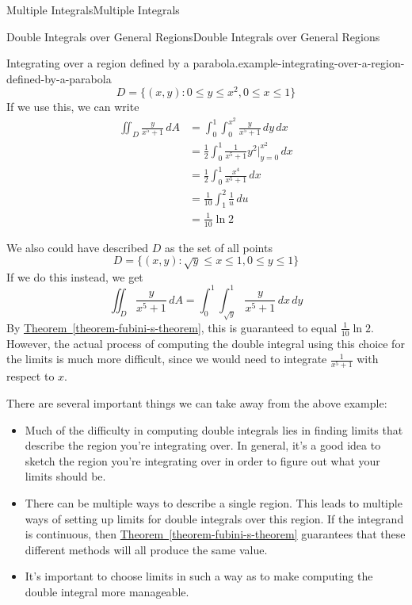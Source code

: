 \documentclass[10pt,]{book}
\numberwithin{equation}{section}
\begin{document}
\begin{chapterptx}{Multiple Integrals}{}{Multiple Integrals}{}{}
\begin{sectionptx}{Double Integrals over General Regions}{}{Double Integrals over General Regions}{}{}
\begin{example}{Integrating over a region defined by a parabola.}{example-integrating-over-a-region-defined-by-a-parabola}
\begin{equation*}
D = \{(x,y) : 0\leq y\leq x^{2}, 0\leq x\leq 1\}
\end{equation*}
If we use this, we can write%
\begin{align*}
\iint_{D}\frac{y}{x^{5}+1}\,dA & = \int_{0}^{1}\int_{0}^{x^{2}}\frac{y}{x^{5}+1}\,dy\,dx \\
& = \frac{1}{2}\int_{0}^{1}\frac{1}{x^{5}+1}y^{2}\bigg|_{y=0}^{x^{2}}\,dx \\
& = \frac{1}{2}\int_{0}^{1}\frac{x^{4}}{x^{5}+1}\,dx \\
& = \frac{1}{10}\int_{1}^{2}\frac{1}{u}\,du \\
& =  \frac{1}{10}\ln2
\end{align*}
%
\par
\hypertarget{p-1257}{}%
We also could have described \(D\) as the set of all points%
\begin{equation*}
D = \{(x,y) : \sqrt{y} \leq x\leq 1, 0\leq y\leq 1\}
\end{equation*}
If we do this instead, we get%
\begin{equation*}
\iint_{D}\frac{y}{x^{5}+1}\,dA = \int_{0}^{1}\int_{\sqrt{y}}^{1}\frac{y}{x^{5}+1}\,dx\,dy 
\end{equation*}
By \hyperref[theorem-fubini-s-theorem]{Theorem~\ref{theorem-fubini-s-theorem}}, this is guaranteed to equal \(\frac{1}{10}\ln2\). However, the actual process of computing the double integral using this choice for the limits is much more difficult, since we would need to integrate \(\frac{1}{x^{5}+1}\) with respect to \(x\).%
\end{example}
\hypertarget{p-1258}{}%
There are several important things we can take away from the above example: \leavevmode%
\begin{itemize}[label=\textbullet]
\item{}Much of the difficulty in computing double integrals lies in finding limits that describe the region you're integrating over. In general, it's a good idea to sketch the region you're integrating over in order to figure out what your limits should be.%
\item{}There can be multiple ways to describe a single region. This leads to multiple ways of setting up limits for double integrals over this region. If the integrand is continuous, then \hyperref[theorem-fubini-s-theorem]{Theorem~\ref{theorem-fubini-s-theorem}} guarantees that these different methods will all produce the same value.%
\item{}It's important to choose limits in such a way as to make computing the double integral more manageable.%

\end{itemize}
\end{sectionptx}
\end{chapterptx}
\end{document}
